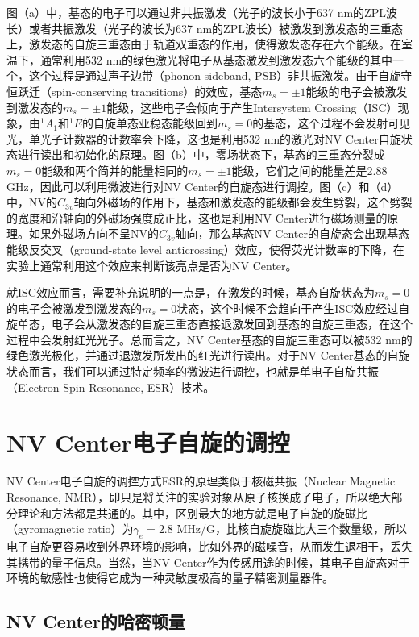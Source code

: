 \documentclass[type = bachelor]{whu-thesis}
\begin{document}
图（a）中，基态的电子可以通过非共振激发（光子的波长小于637 nm的ZPL波长）或者共振激发（光子的波长为637 nm的ZPL波长）被激发到激发态的三重态上，激发态的自旋三重态由于轨道双重态的作用，使得激发态存在六个能级。在室温下，通常利用532 nm的绿色激光将电子从基态激发到激发态六个能级的其中一个，这个过程是通过声子边带（phonon-sideband, PSB）非共振激发。由于自旋守恒跃迁（spin-conserving transitions）的效应，基态$m_s=\pm 1$能级的电子会被激发到激发态的$m_s=\pm 1$能级，这些电子会倾向于产生Intersystem Crossing（ISC）现象，由$^1A_1$和$^1E$的自旋单态亚稳态能级回到$m_s=0$的基态，这个过程不会发射可见光，单光子计数器的计数率会下降，这也是利用532 nm的激光对NV Center自旋状态进行读出和初始化的原理。图（b）中，零场状态下，基态的三重态分裂成$m_s = 0$能级和两个简并的能量相同的$m_s=\pm 1$能级，它们之间的能量差是2.88 GHz，因此可以利用微波进行对NV Center的自旋态进行调控。图（c）和（d）中，NV的$C_{3v}$轴向外磁场的作用下，基态和激发态的能级都会发生劈裂，这个劈裂的宽度和沿轴向的外磁场强度成正比，这也是利用NV Center进行磁场测量的原理。如果外磁场方向不呈NV的$C_{3v}$轴向，那么基态NV Center的自旋态会出现基态能级反交叉（ground-state level anticrossing）效应，使得荧光计数率的下降，在实验上通常利用这个效应来判断该亮点是否为NV Center。

就ISC效应而言，需要补充说明的一点是，在激发的时候，基态自旋状态为$m_s = 0$的电子会被激发到激发态的$m_s = 0$状态，这个时候不会趋向于产生ISC效应经过自旋单态，电子会从激发态的自旋三重态直接退激发回到基态的自旋三重态，在这个过程中会发射红光光子。总而言之，NV Center基态的自旋三重态可以被532 nm的绿色激光极化，并通过退激发所发出的红光进行读出。对于NV Center基态的自旋状态而言，我们可以通过特定频率的微波进行调控，也就是单电子自旋共振（Electron Spin Resonance, ESR）技术。

\section{NV Center电子自旋的调控}

NV Center电子自旋的调控方式ESR的原理类似于核磁共振（Nuclear Magnetic Resonance, NMR），即只是将关注的实验对象从原子核换成了电子，所以绝大部分理论和方法都是共通的。其中，区别最大的地方就是电子自旋的旋磁比（gyromagnetic ratio）为$\gamma_e=2.8$ MHz/G，比核自旋旋磁比大三个数量级，所以电子自旋更容易收到外界环境的影响，比如外界的磁噪音，从而发生退相干，丢失其携带的量子信息。当然，当NV Center作为传感用途的时候，其电子自旋态对于环境的敏感性也使得它成为一种灵敏度极高的量子精密测量器件。

\subsection{NV Center的哈密顿量}
\end{document}
